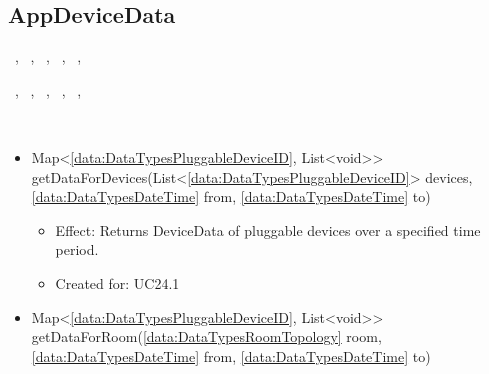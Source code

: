   \subsection{AppDeviceData}\label{int:OnlineServiceOnlineServiceApplicationManagerApplicationManagementLogicAppDeviceData}
    \begin{description}
      \item[Provided by:] \iconcomponent{}~, \iconcomponent{}~, \iconcomponent{}~, \iconcomponent{}~, \iconcomponent{}~, \iconcomponent{}~
      \item[Required by:] \iconcomponent{}~, \iconcomponent{}~, \iconcomponent{}~, \iconcomponent{}~, \iconcomponent{}~, \iconcomponent{}~
      \item[Operations:] ~
    \begin{itemize}[noitemsep,nolistsep,leftmargin=-.25cm]
      \item \textsf{Map\textless{}\ref{data:DataTypesPluggableDeviceID}, List\textless{}void\textgreater{}\textgreater{} getDataForDevices(List\textless{}\ref{data:DataTypesPluggableDeviceID}\textgreater{} devices, \ref{data:DataTypesDateTime} from, \ref{data:DataTypesDateTime} to)}
        \begin{itemize}[noitemsep,nolistsep]
           \item Effect: Returns DeviceData of pluggable devices over a specified time period.
\item Created for: UC24.1
        \end{itemize}
      \item \textsf{Map\textless{}\ref{data:DataTypesPluggableDeviceID}, List\textless{}void\textgreater{}\textgreater{} getDataForRoom(\ref{data:DataTypesRoomTopology} room, \ref{data:DataTypesDateTime} from, \ref{data:DataTypesDateTime} to)}

\end{itemize}
\end{description}
